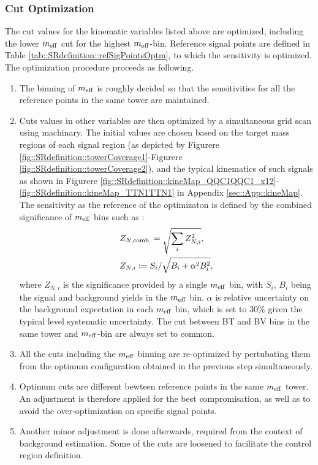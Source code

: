 \clearpage		
\subsubsection{Cut Optimization}
The cut values for the kinematic variables listed above are optimized, including the lower $m_{\mathrm{eff}}$ cut for the highest $m_{\mathrm{eff}}$-bin. Reference signal points are defined in Table \ref{tab::SRdefinition::refSigPointsOptm}, to which the sensitivity is optimized. The optimization procedure proceeds as following.

\begin{enumerate}
\item The binning of $m_{\mathrm{eff}}$ is roughly decided so that the sensitivities for all the reference points in the same tower are maintained.
\item Cuts values in other variables are then optimized by a simultaneous grid scan using machinary. The initial values are chosen based on the target mass regions of each signal region (as depicted by Figurere \ref{fig::SRdefinition::towerCoverage1}-Figurere \ref{fig::SRdefinition::towerCoverage2}), and the typical kinematics of such signals as shown in Figurere \ref{fig::SRdefinition::kineMap_QQC1QQC1_x12}-\ref{fig::SRdefinition::kineMap_TTN1TTN1} in Appendix \ref{sec::App::kineMap}.
The sensitivity as the reference of the optimizaton is defined by the combined significance of $m_{\mathrm{eff}}$ bins such as :
\begin{align}
& Z_{N,\mathrm{comb.}} =\sqrt{\sum_i Z_{N,i}^2}, \nonumber \\
& Z_{N,i} := S_i/\sqrt{B_i+\alpha^2 B_i^2}, \label{ZNcomb}
\end{align}
where $Z_{N,i}$ is the significance provided by a single $m_{\mathrm{eff}}$ bin, with $S_i$, $B_i$ being the signal and background yields in the $m_{\mathrm{eff}}$ bin. $\alpha$ is relative uncertainty on the background expectation in each $m_{\mathrm{eff}}$ bin, which is set to $30\%$ given the typical level systematic uncertainty. The cut between BT and BV bins in the same tower and $m_{\mathrm{eff}}$-bin are always set to common.

\item All the cuts including the $m_{\mathrm{eff}}$ binning are re-optimized by pertubating them from the optimum configuration obtained in the previous step simultaneously.

\item Optimum cuts are different bewteen reference points in the same $m_{\mathrm{eff}}$ tower. An adjustment is therefore applied for the best compromisation, as well as to avoid the over-optimization on specific signal points.

\item Another minor adjustment is done afterwards, required from the context of background estimation. Some of the cuts are loosened to facilitate the control region definition.
\end{enumerate}

